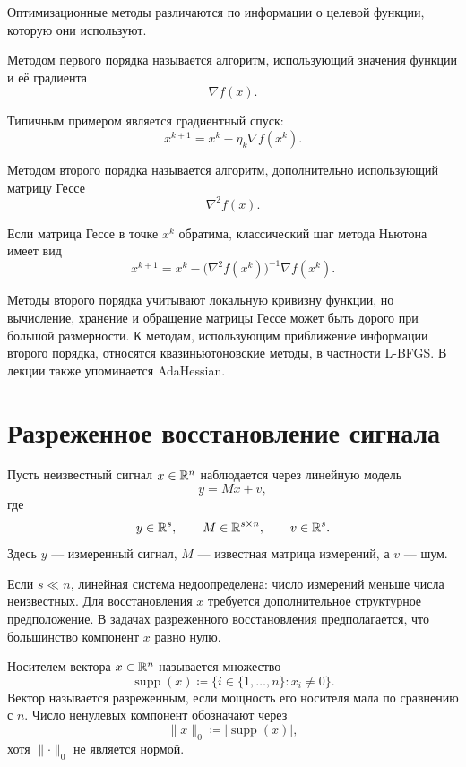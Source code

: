 Оптимизационные методы различаются по информации о целевой функции,
которую они используют.

\begin{definition}
Методом первого порядка называется алгоритм, использующий значения
функции и её градиента
\[
    \nabla f(x).
\]
\end{definition}

Типичным примером является градиентный спуск:
\[
    x^{k+1}=x^k-\eta_k\nabla f(x^k).
\]

\begin{definition}
Методом второго порядка называется алгоритм, дополнительно
использующий матрицу Гессе
\[
    \nabla^2f(x).
\]
\end{definition}

Если матрица Гессе в точке \(x^k\) обратима, классический шаг
метода Ньютона имеет вид
\[
    x^{k+1}
    =
    x^k
    -
    \bigl(\nabla^2f(x^k)\bigr)^{-1}
    \nabla f(x^k).
\]

Методы второго порядка учитывают локальную кривизну функции, но
вычисление, хранение и обращение матрицы Гессе может быть дорого при
большой размерности. К методам, использующим приближение информации
второго порядка, относятся квазиньютоновские методы, в частности
L-BFGS. В лекции также упоминается AdaHessian.

\section{Разреженное восстановление сигнала}

Пусть неизвестный сигнал \(x\in\mathbb{R}^n\) наблюдается через линейную
модель
\[
    y=Mx+v,
\]
где
\[
    y\in\mathbb{R}^s,\qquad
    M\in\mathbb{R}^{s\times n},\qquad
    v\in\mathbb{R}^s.
\]
Здесь \(y\) --- измеренный сигнал, \(M\) --- известная матрица
измерений, а \(v\) --- шум.

Если \(s\ll n\), линейная система недоопределена: число измерений
меньше числа неизвестных. Для восстановления \(x\) требуется
дополнительное структурное предположение. В задачах разреженного
восстановления предполагается, что большинство компонент \(x\)
равно нулю.

\begin{definition}
Носителем вектора \(x\in\mathbb{R}^n\) называется множество
\[
    \operatorname{supp}(x)
    \coloneqq
    \{i\in\{1,\ldots,n\}:x_i\ne0\}.
\]
Вектор называется разреженным, если мощность его носителя мала по
сравнению с \(n\). Число ненулевых компонент обозначают через
\[
    \lVert x\rVert_0
    \coloneqq
    \bigl\lvert\operatorname{supp}(x)\bigr\rvert,
\]
хотя \(\lVert\cdot\rVert_0\) не является нормой.
\end{definition}

